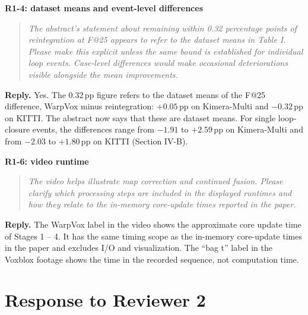 \documentclass[11pt,a4paper]{article}
\newcommand{\point}[2]{\par\medskip\textbf{#1}\par\begin{quote}\itshape #2\end{quote}}
\newenvironment{reply}{\begingroup\color{replyblue}\textbf{Reply.} }{\par\endgroup}
\begin{document}
\point{R1-4: dataset means and event-level differences}{The abstract's statement about remaining within 0.32 percentage points of reintegration at F@25 appears to refer to the dataset means in Table I. Please make this explicit unless the same bound is established for individual loop events. Case-level differences would make occasional deteriorations visible alongside the mean improvements.}
\begin{reply}
Yes. The 0.32\,pp figure refers to the dataset means of the F@25 difference, WarpVox minus reintegration: $+0.05$\,pp on Kimera-Multi and $-0.32$\,pp on KITTI. The abstract now says that these are dataset means. For single loop-closure events, the differences range from $-1.91$ to $+2.59$\,pp on Kimera-Multi and from $-2.03$ to $+1.80$\,pp on KITTI (Section IV-B).
\end{reply}
\point{R1-6: video runtime}{The video helps illustrate map correction and continued fusion. Please clarify which processing steps are included in the displayed runtimes and how they relate to the in-memory core-update times reported in the paper.}
\begin{reply}
The WarpVox label in the video shows the approximate core update time of Stages 1 -- 4. It has the same timing scope as the in-memory core-update times in the paper and excludes I/O and visualization. The ``bag t'' label in the Voxblox footage shows the time in the recorded sequence, not computation time.
\end{reply}
\section*{Response to Reviewer 2}
\end{document}
